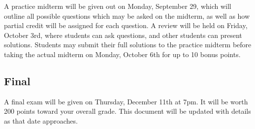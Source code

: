 \documentclass[11pt]{article}
\begin{document}
A practice midterm will be given out on Monday, September 29, which will
outline all possible questions which may be asked on the midterm, as well
as how partial credit will be assigned for each question. A review
will be held on Friday, October 3rd, where students can ask questions, and
other students can present solutions. Students may submit their full solutions
to the practice midterm before taking the actual midterm
on Monday, October 6th for up to 10 bonus points.

\subsection{Final}

A final exam will be given on Thursday, December 11th at 7pm. It will be worth
200 points toward your overall grade. This document
will be updated with details as that date approaches.
\end{document}
